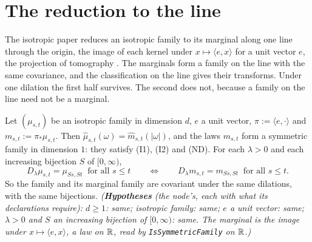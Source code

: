 \section{The reduction to the line}
\label{sec:pyramid-reduction}

The isotropic paper reduces an isotropic family to its marginal along one line through the origin,
the image of each kernel under $x \mapsto \langle e, x\rangle$ for a unit vector $e$, the projection
of tomography . The marginals form a family on the line with the same
covariance, and the classification on the line gives their transforms. Under one dilation the first
half survives. The second does not, because a family on the line need not be a marginal.

\begin{lemma}
\label{lem:reduction-keeps-stratum}
\leanok
{}
Let $(\mu_{s,t})$ be an isotropic family in dimension $d$, $e$ a unit vector,
$\pi := \langle e, \cdot\rangle$ and $m_{s,t} := \pi_*\mu_{s,t}$. Then
$\widehat\mu_{s,t}(\omega) = \widehat m_{s,t}(|\omega|)$, and the laws $m_{s,t}$ form a symmetric
family in dimension $1$: they satisfy (I1), (I2) and (ND). For each $\lambda > 0$ and each increasing
bijection $S$ of $[0, \infty)$,
\[
  D_\lambda\mu_{s,t} = \mu_{Ss,St}\ \text{ for all } s \le t \qquad\Longleftrightarrow\qquad
  D_\lambda m_{s,t} = m_{Ss,St}\ \text{ for all } s \le t.
\]
So the family and its marginal family are covariant under the same dilations, with the same
bijections.
\statusT\quad\emph{(\textbf{Hypotheses} (the node's, each with what its declarations require):
$d \ge 1$: same; isotropic family: same; $e$ a unit vector: same; $\lambda > 0$ and $S$ an
increasing bijection of $[0,\infty)$: same. The marginal is the image under
$x \mapsto \langle e, x\rangle$, a law on $\mathbb{R}$, read by \texttt{IsSymmetricFamily} on $\mathbb{R}$.)}
\end{lemma}

